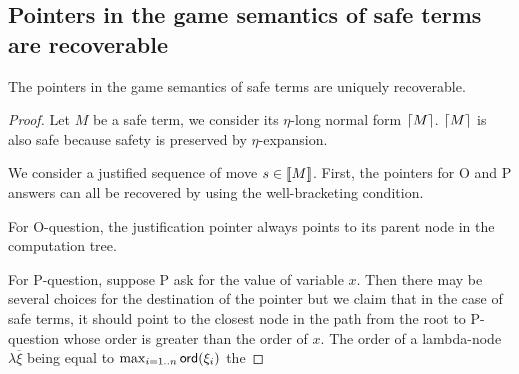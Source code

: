 
\subsection{Pointers in the game semantics of safe terms are recoverable}

\begin{prop}
The pointers in the game semantics of safe terms are
uniquely recoverable.
\end{prop}

\begin{proof}
Let $M$ be a safe term, we consider its $\eta$-long normal form $\lceil M\rceil$.
$\lceil M\rceil$ is also safe because safety is preserved by $\eta$-expansion.

We consider a justified sequence of move $s \in {[\![M ]\!]}$.
First, the pointers for O and P answers can all be recovered by using the well-bracketing condition.

For O-question, the justification pointer always points to its
parent node in the computation tree.

For P-question, suppose P ask for the value of variable $x$. Then
there may be several choices for the destination of the pointer but
we claim that in the case of safe terms, it should point to the
closest node in the path from the root to P-question whose
order is greater than the order of $x$. The order of a lambda-node
$\lambda \overline{\xi}$ being equal to $\max_{i=1..n} {\sf ord}(\xi_i)$ the


\end{proof}
